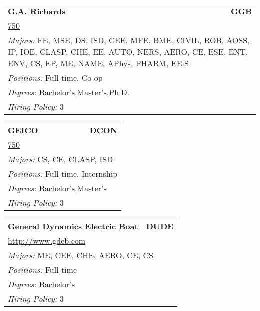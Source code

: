 \documentclass[twoside]{article}
\begin{document}
\begin{center}
\begin{multicols}{3}
\begin{FlushLeft}
\begin{minipage}{.9\columnwidth}\begin{tabularx}{.95\columnwidth}{Xr}
                 {\Large\bf G.A. Richards} & {\Large\bf GGB}\\
    \multicolumn{2}{p{.95\columnwidth}}{\url{750}}\\
    \multicolumn{2}{p{.95\columnwidth}}{\emph{Majors:} FE, MSE, DS, ISD, CEE, MFE, BME, CIVIL, ROB, AOSS, IP, IOE, CLASP, CHE, EE, AUTO, NERS, AERO, CE, ESE, ENT, ENV, CS, EP, ME, NAME, APhys, PHARM, EE:S}\\
    \multicolumn{2}{p{.95\columnwidth}}{\emph{Positions:} Full-time, Co-op}\\
    \multicolumn{2}{p{.95\columnwidth}}{\emph{Degrees:} Bachelor's,Master's,Ph.D.}\\
    \multicolumn{2}{p{.95\columnwidth}}{\emph{Hiring Policy:} 3}\\
    \end{tabularx}
    
\end{minipage}
 
\begin{minipage}{.9\columnwidth}\begin{tabularx}{.95\columnwidth}{Xr}
                 {\Large\bf GEICO} & {\Large\bf DCON}\\
    \multicolumn{2}{p{.95\columnwidth}}{\url{750}}\\
    \multicolumn{2}{p{.95\columnwidth}}{\emph{Majors:} CS, CE, CLASP, ISD}\\
    \multicolumn{2}{p{.95\columnwidth}}{\emph{Positions:} Full-time, Internship}\\
    \multicolumn{2}{p{.95\columnwidth}}{\emph{Degrees:} Bachelor's,Master's}\\
    \multicolumn{2}{p{.95\columnwidth}}{\emph{Hiring Policy:} 3}\\
    \end{tabularx}
    
\end{minipage}
 
\begin{minipage}{.9\columnwidth}\begin{tabularx}{.95\columnwidth}{Xr}
                 {\Large\bf General Dynamics Electric Boat} & {\Large\bf DUDE}\\
    \multicolumn{2}{p{.95\columnwidth}}{\url{http://www.gdeb.com}}\\
    \multicolumn{2}{p{.95\columnwidth}}{\emph{Majors:} ME, CEE, CHE, AERO, CE, CS}\\
    \multicolumn{2}{p{.95\columnwidth}}{\emph{Positions:} Full-time}\\
    \multicolumn{2}{p{.95\columnwidth}}{\emph{Degrees:} Bachelor's}\\
    \multicolumn{2}{p{.95\columnwidth}}{\emph{Hiring Policy:} 3}\\
    \end{tabularx}
    

\end{minipage}
\end{FlushLeft}
\end{multicols}
\end{center}
\end{document}
